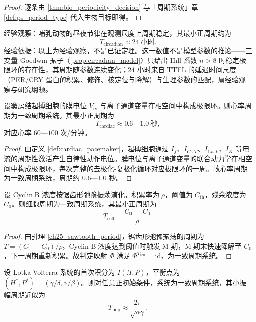 \begin{proof}
逐条由 \cref{thm:bio_periodicity_decision} 与「周期系统」章 \cref{def:ps_period_type} 代入生物目标即得。
\end{proof}

\begin{remark}\label{lem:circadian_periodic}
经验观察：哺乳动物的昼夜节律在观测尺度上周期稳定，其最小正周期约为
\[
T_{\text{circadian}} \approx 24\ \text{小时}.
\]
经验依据：以上为经验观察，不是已证定理。这一数值不是模型参数的推论——三变量 Goodwin 振子（\cref{prop:circadian_model}）只给出 Hill 系数 $n > 8$ 时稳定极限环的存在性，其周期随参数连续变化；$24$ 小时来自 TTFL 的延迟时间尺度（PER/CRY 蛋白的积累、修饰、核定位与降解）与生理参数的匹配，属经验观察与研究纲领。
\end{remark}

\begin{lemma}[心率周期的判定]\label{lem:cardiac_periodic}
设窦房结起搏细胞的膜电位 $V_m$ 与离子通道变量在相空间中构成极限环。则心率周期为一致周期系统，其最小正周期为
\[
T_{\text{cardiac}} \approx 0.6\text{—}1.0\ \text{秒},
\]
对应心率 $60$—$100$ 次/分钟。
\end{lemma}

\begin{proof}
由定义 \ref{def:cardiac_pacemaker}，起搏细胞通过 $I_f$、$I_{Ca\text{-}T}$、$I_{Ca\text{-}L}$、$I_K$ 等电流的周期性激活产生自律性动作电位。膜电位与离子通道变量的联合动力学在相空间中构成极限环，每次完整的去极化-复极化循环对应极限环的一周。故心率周期为一致周期系统，周期约 $0.6$—$1.0$ 秒。
\end{proof}

\begin{lemma}[细胞周期的判定]\label{lem:cell_cycle_periodic}
设 Cyclin B 浓度按锯齿形弛豫振荡演化，积累率为 $\rho$，阈值为 $C_{\text{th}}$，残余浓度为 $C_0$。则细胞周期为一致周期系统，其最小正周期为
\[
T_{\text{cell}} = \frac{C_{\text{th}} - C_0}{\rho}.
\]
\end{lemma}

\begin{proof}
由引理 \ref{ch25_sawtooth_period}，锯齿形弛豫振荡的周期为 $T=(C_{\text{th}}-C_0)/\rho$。Cyclin B 浓度达到阈值时触发 M 期，M 期末快速降解至 $C_0$，下一周期重新积累。故判定映射 $\Phi$ 满足 $\Phi^{T_{\text{cell}}}=\mathrm{id}$，为一致周期系统。
\end{proof}

\begin{lemma}[种群周期的判定]\label{lem:population_periodic}
设 Lotka-Volterra 系统的首次积分为 $I(H,P)$，平衡点为 $(H^*,P^*)=(\gamma/\delta,\alpha/\beta)$。则对任意正初始条件，系统为一致周期系统，其小振幅周期近似为
\[
T_{\text{pop}} \approx \frac{2\pi}{\sqrt{\alpha\gamma}}.
\]
\end{lemma}

